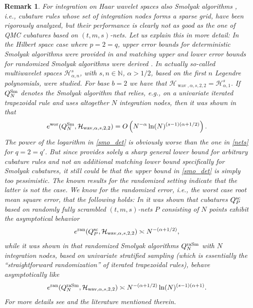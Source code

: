 \documentclass[12pt]{article}
\DeclareMathOperator{\wav}{wav}
\DeclareMathOperator{\wor}{wor}
\newtheorem{remark}{Remark}
\newcommand{\HH}{\mathcal{H}}
\newcommand{\N}{\mathbb{N}}
\begin{document}
\begin{remark}\label{Rem:Smolyak}
For integration on Haar wavelet spaces also Smolyak algorithms \cite{Smo63}, i.e., cubature rules whose set of integration nodes forms a sparse grid, have been rigorously analyzed, but their performance is clearly not as good as the one of QMC cubatures based on $(t,m,s)$-nets. Let us explain this in more detail: In the Hilbert space case where $p=2=q$, upper error bounds for deterministic Smolyak algorithms were provided in \cite{GLS07} and matching upper and lower error bounds for randomized Smolyak algorithms were derived \cite{WG23}.
In \cite{GLS07} actually so-called multiwavelet spaces $\mathcal{H}^s_{\alpha,n}$, with $s,n \in \N$, $\alpha > 1/2$,  based on the first $n$ Legendre polynomials, were studied. For base $b=2$ we have that $\HH_{\wav, \alpha, s,2,2} = \mathcal{H}^s_{\alpha,1}$. 
If $Q^{\rm Sm}_N$ denotes the Smolyak algorithm that relies, e.g., on a univariate iterated trapezoidal rule and uses altogether $N$ integration nodes, then it was shown in \cite[Corollary~4.7]{GLS07} that 
\begin{equation}\label{smo_det}
e^{\wor}(Q^{\rm Sm}_N, \HH_{\wav,\alpha,s,2,2}) 
= O \left( N^{-\alpha} \ln(N)^{(s-1)(\alpha + 1/2)} \right).
\end{equation}
The power of the logarithm in \eqref{smo_det} is obviously worse than the one in 
\eqref{nets} for $q=2=q'$. But since \cite{GLS07} provides solely a sharp general lower bound for arbitrary  cubature rules and not an additional matching lower bound specifically for Smolyak cubatures, it still could be that the upper bound in \eqref{smo_det} is simply too pessimistic. The known results for the randomized setting indicate that 
the latter is not the case. We know for the randomized error, i.e., the worst case root mean square error, that the following holds: In \cite{HHY04} it was shown 
that cubatures $Q^{\rm sc}_P$ based on randomly fully scrambled $(t,m,s)$-nets $P$ consisting of $N$ points %
exhibit the asymptotical behavior
\begin{equation}\label{nets_ran}
e^{\rm ran}(Q^{\rm sc}_P, \HH_{\wav,\alpha,s,2,2}) 
\asymp N^{-(\alpha + 1/2)},
\end{equation}
while it was shown in \cite{WG23} that randomized Smolyak algorithms $Q^{\rm raSm}_N$ with $N$ integration nodes, based on univariate stratified sampling (which is essentially the ``straightforward randomization'' of iterated trapezoidal rules), behave asymptotically like
\begin{equation}\label{smo_ran}
e^{\rm ran}(Q^{\rm raSm}_N, \HH_{\wav,\alpha,s,2,2}) 
\asymp N^{-(\alpha + 1/2)} \ln(N)^{(s-1)(\alpha + 1)}.
\end{equation}
For more details see \cite{GLS07, WG23} and the literature mentioned therein.
\end{remark}
\end{document}
